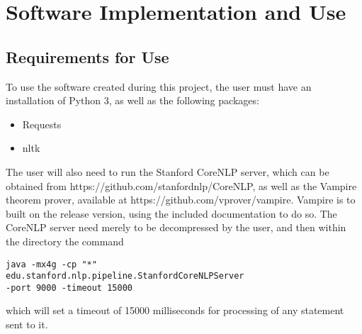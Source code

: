 \chapter{Software Implementation and Use}

\section{Requirements for Use}

To use the software created during this project, the user must have an installation of Python 3, as well as the following packages:
\begin{itemize}
\item Requests
\item nltk
\end{itemize}

The user will also need to run the Stanford CoreNLP server, which can be obtained from https://github.com/stanfordnlp/CoreNLP, as well as the Vampire theorem prover, available at https://github.com/vprover/vampire. Vampire is to built on the release version, using the included documentation to do so. The CoreNLP server need merely to be decompressed by the user, and then within the directory the command

\begin{verbatim}
java -mx4g -cp "*"
edu.stanford.nlp.pipeline.StanfordCoreNLPServer
-port 9000 -timeout 15000
\end{verbatim}


which will set a timeout of 15000 milliseconds for processing of any statement sent to it.
